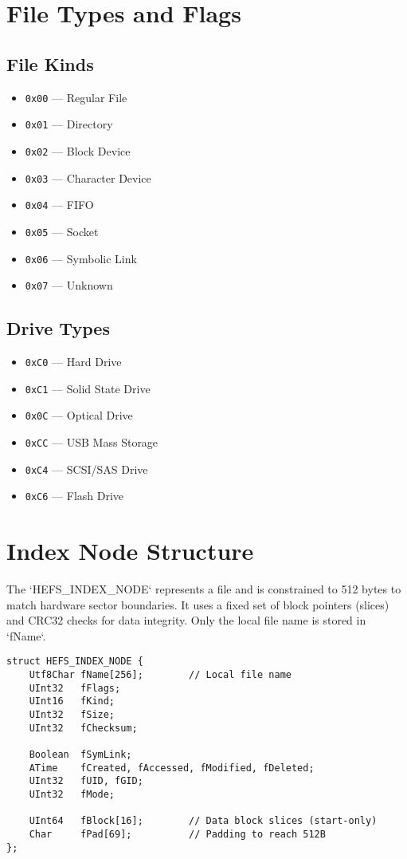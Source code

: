 \documentclass{article}
\begin{document}
\section{File Types and Flags}
\subsection*{File Kinds}
\begin{itemize}[label=--]
    \item \verb|0x00| --- Regular File
    \item \verb|0x01| --- Directory
    \item \verb|0x02| --- Block Device
    \item \verb|0x03| --- Character Device
    \item \verb|0x04| --- FIFO
    \item \verb|0x05| --- Socket
    \item \verb|0x06| --- Symbolic Link
    \item \verb|0x07| --- Unknown
\end{itemize}

\subsection*{Drive Types}
\begin{itemize}[label=--]
    \item \verb|0xC0| --- Hard Drive
    \item \verb|0xC1| --- Solid State Drive
    \item \verb|0x0C| --- Optical Drive
    \item \verb|0xCC| --- USB Mass Storage
    \item \verb|0xC4| --- SCSI/SAS Drive
    \item \verb|0xC6| --- Flash Drive
\end{itemize}

\section{Index Node Structure}
The `HEFS\_INDEX\_NODE` represents a file and is constrained to 512 bytes to match hardware sector boundaries. It uses a fixed set of block pointers (slices) and CRC32 checks for data integrity. Only the local file name is stored in `fName`.

\begin{lstlisting}[style=cstyle, caption={HEFS\_INDEX\_NODE (Fits 512B)}]
struct HEFS_INDEX_NODE {
    Utf8Char fName[256];        // Local file name
    UInt32   fFlags;
    UInt16   fKind;
    UInt32   fSize;
    UInt32   fChecksum;

    Boolean  fSymLink;
    ATime    fCreated, fAccessed, fModified, fDeleted;
    UInt32   fUID, fGID;
    UInt32   fMode;

    UInt64   fBlock[16];        // Data block slices (start-only)
    Char     fPad[69];          // Padding to reach 512B
};
\end{lstlisting}
\end{document}
